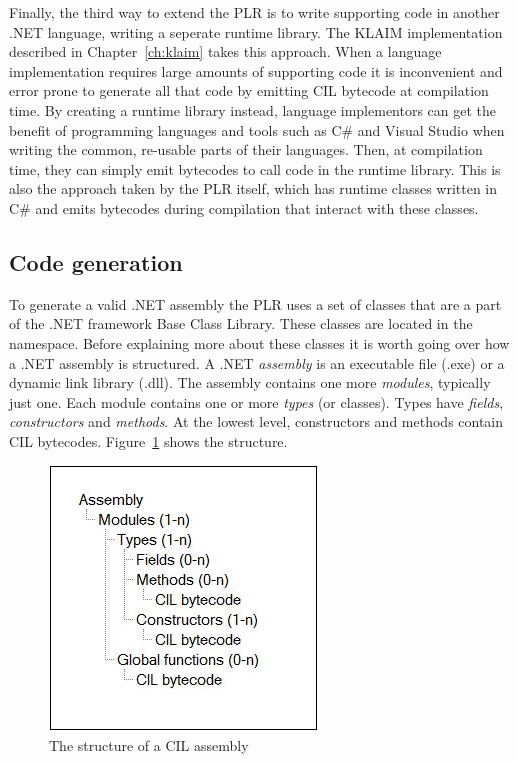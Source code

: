 	Finally, the third way to extend the PLR is to write supporting code in
	another .NET language, writing a seperate runtime library. The KLAIM 
	implementation described in Chapter~\ref{ch:klaim} takes this approach. When 
	a language implementation requires large amounts of supporting code it is 
	inconvenient and error prone to generate all that code by emitting CIL 
	bytecode at compilation time. By creating a runtime library instead, 
	language implementors can get the benefit of programming languages and tools 
	such as C\# and Visual Studio when writing the common, re-usable parts of 
	their languages. Then, at compilation time, they can simply emit bytecodes 
	to call code in the runtime library. This is also the approach taken by the 
	PLR itself, which has runtime classes written in C\# and emits bytecodes 
	during compilation that interact with these classes.	

\subsection{Code generation}
	
	To generate a valid .NET assembly the PLR uses a set of classes that are a 
	part of the .NET framework Base Class Library. These classes are located in 
	the  namespace. Before explaining more about 
	these classes it is worth going over how a .NET assembly is structured. A 
	.NET \textit{assembly} is an executable file (.exe) or a dynamic link 
	library (.dll). The assembly contains one more \textit{modules}, typically 
	just one. Each module contains one or more \textit{types} (or classes). 
	Types have \textit{fields}, \textit{constructors} and \textit{methods}. At 
	the lowest level, constructors and methods contain CIL bytecodes. 
	Figure~\ref{fig:assembly} shows the structure.

	\begin{figure}[h!]
		\centering
		\includegraphics{assembly2.jpg}
		\caption{The structure of a CIL assembly}
		\label{fig:assembly}
	\end{figure}
	
